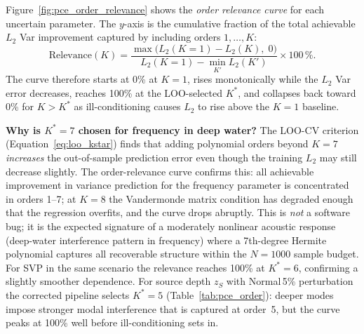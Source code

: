 \documentclass[11pt,a4paper]{article}
\begin{document}
Figure~\ref{fig:pce_order_relevance} shows the \emph{order relevance curve} for each
uncertain parameter.  The $y$-axis is the cumulative fraction of the total achievable
$L_2$ Var improvement captured by including orders $1, \ldots, K$:
\begin{equation}
  \mathrm{Relevance}(K) = \frac{\max\bigl(L_2(K{=}1) - L_2(K),\;0\bigr)}%
                               {L_2(K{=}1) - \min_{K'} L_2(K')} \times 100\,\%.
  \label{eq:relevance}
\end{equation}
The curve therefore starts at 0\% at $K=1$, rises monotonically while the $L_2$ Var error
decreases, reaches 100\% at the LOO-selected $K^*$, and collapses back toward 0\%
for $K > K^*$ as ill-conditioning causes $L_2$ to rise above the $K=1$ baseline.

\textbf{Why is $K^*=7$ chosen for frequency in deep water?}
The LOO-CV criterion (Equation~\ref{eq:loo_kstar}) finds that adding polynomial orders
beyond $K=7$ \emph{increases} the out-of-sample prediction error even though the
training $L_2$ may still decrease slightly.  The order-relevance curve confirms this:
all achievable improvement in variance prediction for the frequency parameter is
concentrated in orders 1--7; at $K=8$ the Vandermonde matrix condition has degraded
enough that the regression overfits, and the curve drops abruptly.  This is \emph{not}
a software bug; it is the expected signature of a moderately nonlinear acoustic
response (deep-water interference pattern in frequency) where a 7th-degree Hermite
polynomial captures all recoverable structure within the $N=1000$ sample budget.
For SVP in the same scenario the relevance reaches 100\% at $K^*=6$, confirming a
slightly smoother dependence.  For source depth $z_S$ with Normal\,5\% perturbation
the corrected pipeline selects $K^*=5$ (Table~\ref{tab:pce_order}): deeper modes
impose stronger modal interference that is captured at order~5, but the curve
peaks at 100\% well before ill-conditioning sets in.
\end{document}
